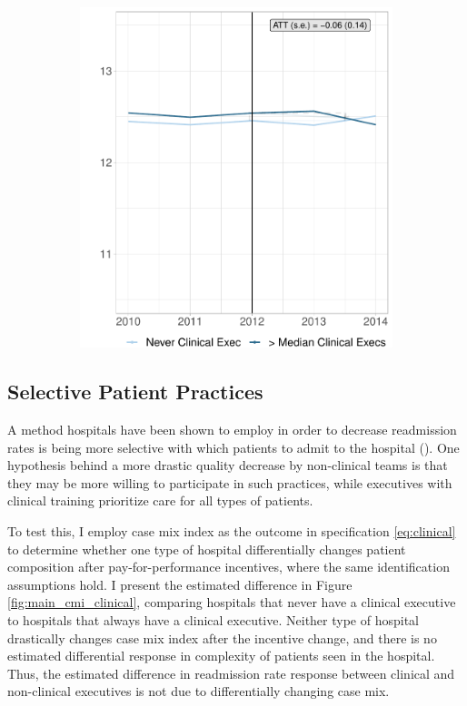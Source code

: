 \documentclass[12pt]{article}
\begin{document}
\begin{figure}[ht!]
\begin{subfigure}[b]{0.45\textwidth}
         \includegraphics[width=\textwidth]{Objects/cont_abovemedmort_md_nomd_size_synth_graph.pdf}
         \label{fig:abovemed_read_synth_clinical}
     \end{subfigure}
        \label{fig:cont_clinicalsynthdid}
    \end{figure}


    

    \subsection{Selective Patient Practices}\label{app:casemix}

    A method hospitals have been shown to employ in order to decrease readmission rates is being more selective with which patients to admit to the hospital (\cite{gupta2021impacts}). One hypothesis behind a more drastic quality decrease by non-clinical teams is that they may be more willing to participate in such practices, while executives with clinical training prioritize care for all types of patients. 

    To test this, I employ case mix index as the outcome in specification \ref{eq:clinical} to determine whether one type of hospital differentially changes patient composition after pay-for-performance incentives, where the same identification assumptions hold. I present the estimated difference in Figure \ref{fig:main_cmi_clinical}, comparing hospitals that never have a clinical executive to hospitals that always have a clinical executive. Neither type of hospital drastically changes case mix index after the incentive change, and there is no estimated differential response in complexity of patients seen in the hospital. Thus, the estimated difference in readmission rate response between clinical and non-clinical executives is not due to differentially changing case mix. 
\end{document}
